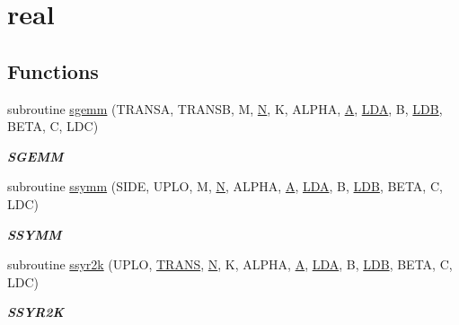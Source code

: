 \hypertarget{group__single__blas__level3}{}\section{real}
\label{group__single__blas__level3}
\subsection*{Functions}
\begin{DoxyCompactItemize}
\item 
subroutine \hyperlink{group__single__blas__level3_gafe51bacb54592ff5de056acabd83c260}{sgemm} (T\+R\+A\+N\+S\+A, T\+R\+A\+N\+S\+B, M, \hyperlink{polmisc_8c_a0240ac851181b84ac374872dc5434ee4}{N}, K, A\+L\+P\+H\+A, \hyperlink{classA}{A}, \hyperlink{example__user_8c_ae946da542ce0db94dced19b2ecefd1aa}{L\+D\+A}, B, \hyperlink{example__user_8c_a50e90a7104df172b5a89a06c47fcca04}{L\+D\+B}, B\+E\+T\+A, C, L\+D\+C)
\begin{DoxyCompactList}\small\item\em {\bfseries S\+G\+E\+M\+M} \end{DoxyCompactList}\item 
subroutine \hyperlink{group__single__blas__level3_ga8e8391a9873114d97e2b63e39fe83b2e}{ssymm} (S\+I\+D\+E, U\+P\+L\+O, M, \hyperlink{polmisc_8c_a0240ac851181b84ac374872dc5434ee4}{N}, A\+L\+P\+H\+A, \hyperlink{classA}{A}, \hyperlink{example__user_8c_ae946da542ce0db94dced19b2ecefd1aa}{L\+D\+A}, B, \hyperlink{example__user_8c_a50e90a7104df172b5a89a06c47fcca04}{L\+D\+B}, B\+E\+T\+A, C, L\+D\+C)
\begin{DoxyCompactList}\small\item\em {\bfseries S\+S\+Y\+M\+M} \end{DoxyCompactList}\item 
subroutine \hyperlink{group__single__blas__level3_ga6ee4760a413296c246b1ecbc1ac985a0}{ssyr2k} (U\+P\+L\+O, \hyperlink{superlu__enum__consts_8h_a0c4e17b2d5cea33f9991ccc6a6678d62a1f61e3015bfe0f0c2c3fda4c5a0cdf58}{T\+R\+A\+N\+S}, \hyperlink{polmisc_8c_a0240ac851181b84ac374872dc5434ee4}{N}, K, A\+L\+P\+H\+A, \hyperlink{classA}{A}, \hyperlink{example__user_8c_ae946da542ce0db94dced19b2ecefd1aa}{L\+D\+A}, B, \hyperlink{example__user_8c_a50e90a7104df172b5a89a06c47fcca04}{L\+D\+B}, B\+E\+T\+A, C, L\+D\+C)
\begin{DoxyCompactList}\small\item\em {\bfseries S\+S\+Y\+R2\+K} \end{DoxyCompactList}\item 

\end{DoxyCompactItemize}
